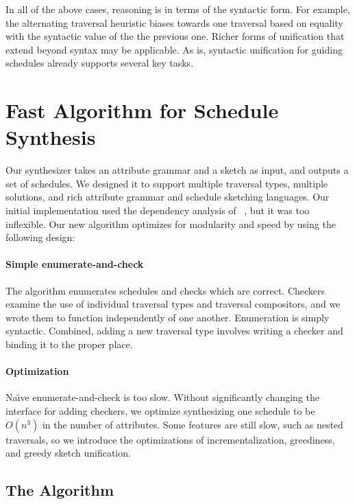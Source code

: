 In all of the above cases, reasoning is in terms of the syntactic form. For example, the alternating traversal heuristic biases towards one traversal based on equality with the syntactic value of the the previous one. Richer forms of unification that extend beyond syntax may be applicable. As is, syntactic unification for guiding schedules already supports several key tasks.




\section{Fast Algorithm for Schedule Synthesis}
Our synthesizer takes an attribute grammar and a sketch as input, and outputs a set of schedules. We designed it to support multiple traversal types, multiple solutions, and rich attribute grammar and schedule sketching languages. Our initial implementation used the dependency analysis of \citeauthor{oag}~\cite{oag}, but it was too inflexible. Our new  algorithm optimizes for modularity and speed by using the following design:

\paragraph*{Simple enumerate-and-check} The algorithm enumerates schedules and checks which are correct. Checkers examine the use of individual traversal types and traversal compositors, and we wrote them to function independently of one another. Enumeration is simply syntactic. Combined, adding a new traversal type involves writing a checker and binding it to the proper place.

\paragraph*{Optimization}
Na\"{\i}ve enumerate-and-check is too slow. Without significantly changing the interface for adding checkers, we optimize synthesizing one schedule to be $O(n^3)$ in the number of attributes. Some features are still slow, such as nested traversals, so we introduce the optimizations of incrementalization, greediness, and greedy sketch unification. 


\subsection{The Algorithm}
\label{sec:sub:greedy}


